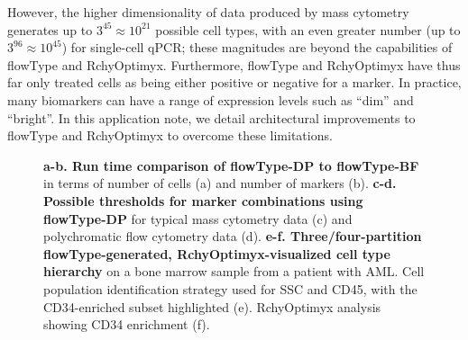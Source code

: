 However, the higher dimensionality of data produced by mass cytometry generates up to $3^{45}\approx10^{21}$ possible cell types, with an even greater number (up to $3^{96}\approx10^{45}$) for single-cell qPCR; these magnitudes are beyond the capabilities of flowType and RchyOptimyx.
Furthermore, flowType and RchyOptimyx have thus far only treated cells as being either positive or negative for a marker.
In practice, many biomarkers can have a range of expression levels such as ``dim'' and ``bright''. 
In this application note, we detail architectural improvements to flowType and RchyOptimyx to overcome these limitations.  
%
%
%
%
%
%
%
\begin{figure}[!tpb]%
\caption{
\textbf{a-b. Run time comparison of flowType-DP to flowType-BF} in terms of number of cells (a) and number of markers (b). 
\textbf{c-d. Possible thresholds for marker combinations using flowType-DP} for typical mass cytometry data (c) and polychromatic flow cytometry data (d). 
\textbf{e-f. Three/four-partition flowType-generated, RchyOptimyx-visualized cell type hierarchy} on a bone marrow sample from a patient with AML. Cell population identification strategy used for SSC and CD45, with the CD34-enriched subset highlighted (e).
RchyOptimyx analysis showing CD34 enrichment (f). }
\label{fig:01}
\end{figure}

